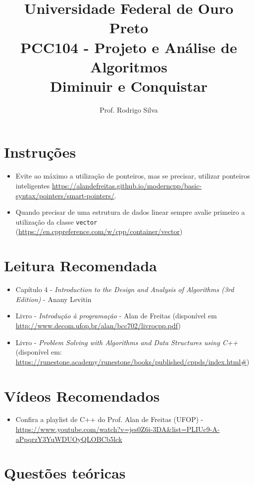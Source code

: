 \documentclass{article}
\title{\vspace{-2 cm}Universidade Federal de Ouro Preto \\ PCC104 - Projeto e Análise de Algoritmos \\ Diminuir e Conquistar}
\author{Prof. Rodrigo Silva}
\begin{document}
\maketitle

\section*{Instruções}

\begin{itemize}
    \item Evite ao máximo a utilização de ponteiros, mas se precisar, utilizar ponteiros inteligentes \url{https://alandefreitas.github.io/moderncpp/basic-syntax/pointers/smart-pointers/}. 
    \item Quando precisar de uma estrutura de dados linear sempre avalie primeiro a utilização da classe \texttt{vector} (\url{https://en.cppreference.com/w/cpp/container/vector})
\end{itemize}

\section{Leitura Recomendada}

\begin{itemize}
    \item Capítulo 4 - \textit{Introduction to the Design and Analysis of Algorithms (3rd Edition)} - Anany Levitin 
    \item Livro - \textit{Introdução à programação} - Alan de Freitas (disponível em \url{http://www.decom.ufop.br/alan/bcc702/livrocpp.pdf})
    \item Livro - \textit{Problem Solving with Algorithms and Data Structures using C++} (disponível em: \url{https://runestone.academy/runestone/books/published/cppds/index.html#})
\end{itemize}

\section{Vídeos Recomendados}
\begin{itemize}
    \item Confira a playlist de C++ do Prof. Alan de Freitas (UFOP) - \url{https://www.youtube.com/watch?v=jes0Z6i-3DA&list=PLIUc9-A-aPpqrzY3YuWDUOyQLOBCb5lck}
\end{itemize}

\section{Questões teóricas}
\end{document}
